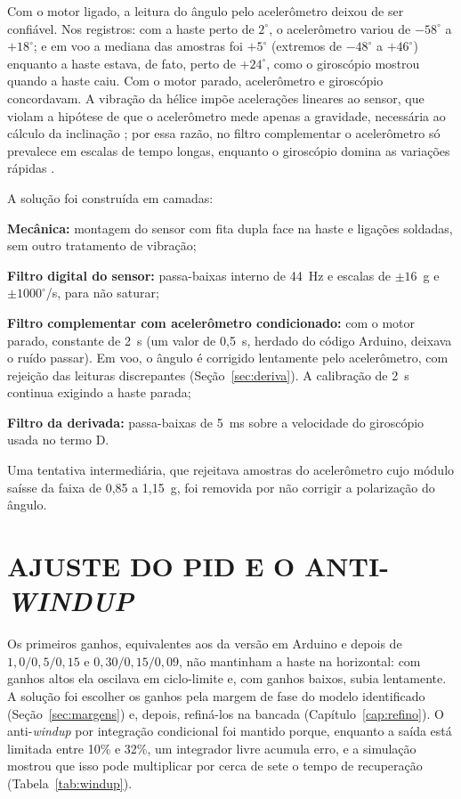 Com o motor ligado, a leitura do ângulo pelo acelerômetro deixou de ser confiável. Nos registros: com a haste perto de $2^\circ$, o acelerômetro variou de $-58^\circ$ a $+18^\circ$; e em voo a mediana das amostras foi $+5^\circ$ (extremos de $-48^\circ$ a $+46^\circ$) enquanto a haste estava, de fato, perto de $+24^\circ$, como o giroscópio mostrou quando a haste caiu. Com o motor parado, acelerômetro e giroscópio concordavam. A vibração da hélice impõe acelerações lineares ao sensor, que violam a hipótese de que o acelerômetro mede apenas a gravidade, necessária ao cálculo da inclinação \cite{nxpan3461,beard2012}; por essa razão, no filtro complementar o acelerômetro só prevalece em escalas de tempo longas, enquanto o giroscópio domina as variações rápidas \cite[p.~8, 14]{colton2007}.

A solução foi construída em camadas:
\begin{alineastcc}
 \item \textbf{Mecânica:} montagem do sensor com fita dupla face na haste e ligações soldadas, sem outro tratamento de vibração;
 \item \textbf{Filtro digital do sensor:} passa-baixas interno de 44~Hz e escalas de $\pm16$~g e $\pm1000^\circ$/s, para não saturar;
 \item \textbf{Filtro complementar com acelerômetro condicionado:} com o motor parado, constante de 2~s (um valor de 0,5~s, herdado do código Arduino, deixava o ruído passar). Em voo, o ângulo é corrigido lentamente pelo acelerômetro, com rejeição das leituras discrepantes (Seção~\ref{sec:deriva}). A calibração de 2~s continua exigindo a haste parada;
 \item \textbf{Filtro da derivada:} passa-baixas de 5~ms sobre a velocidade do giroscópio usada no termo D.
\end{alineastcc}
Uma tentativa intermediária, que rejeitava amostras do acelerômetro cujo módulo saísse da faixa de 0,85 a 1,15~g, foi removida por não corrigir a polarização do ângulo.

\section{AJUSTE DO PID E O ANTI-\textit{WINDUP}}

Os primeiros ganhos, equivalentes aos da versão em Arduino e depois de $1{,}0/0{,}5/0{,}15$ e $0{,}30/0{,}15/0{,}09$, não mantinham a haste na horizontal: com ganhos altos ela oscilava em ciclo-limite e, com ganhos baixos, subia lentamente. A solução foi escolher os ganhos pela margem de fase do modelo identificado (Seção~\ref{sec:margens}) e, depois, refiná-los na bancada (Capítulo~\ref{cap:refino}). O anti-\textit{windup} por integração condicional foi mantido porque, enquanto a saída está limitada entre 10\% e 32\%, um integrador livre acumula erro, e a simulação mostrou que isso pode multiplicar por cerca de sete o tempo de recuperação (Tabela~\ref{tab:windup}).

